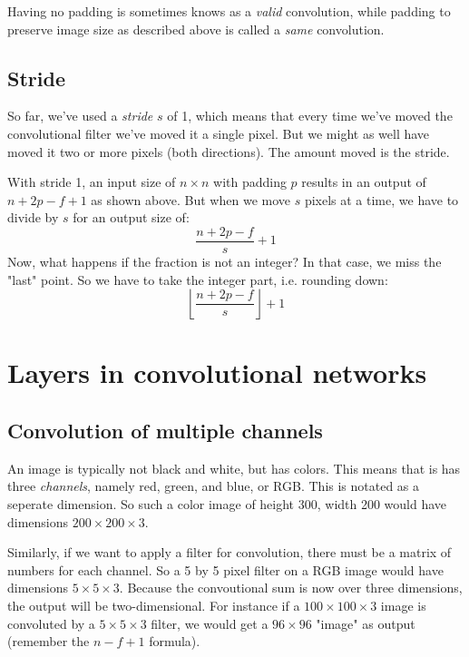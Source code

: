 \documentclass[12pt, a4paper]{article}
\numberwithin{equation}{section}
\begin{document}
Having no padding is sometimes knows as a \textit{valid} convolution, while padding to preserve image size as described above is called a \textit{same} convolution.

\subsection{Stride}
So far, we've used a \textit{stride} $s$ of 1, which means that every time we've moved the convolutional filter we've moved it a single pixel. But we might as well have moved it two or more pixels (both directions). The amount moved is the stride.

With stride 1, an input size of $n\times n$ with padding $p$ results in an output of $n+2p-f+1$ as shown above. But when we move $s$ pixels at a time, we have to divide by $s$ for an output size of:
\begin{equation}
\frac{n+2p-f}{s}+1
\end{equation}
Now, what happens if the fraction is not an integer? In that case, we miss the "last" point. So we have to take the integer part, i.e. rounding down:
\begin{equation}
\left\lfloor\frac{n+2p-f}{s}\right\rfloor+1
\end{equation}

\section{Layers in convolutional networks}

\subsection{Convolution of multiple channels}
An image is typically not black and white, but has colors. This means that is has three \textit{channels}, namely red, green, and blue, or RGB. This is notated as a seperate dimension. So such a color image of height 300, width 200 would have dimensions $200\times 200\times 3$.

Similarly, if we want to apply a filter for convolution, there must be a matrix of numbers for each channel. So a 5 by 5 pixel filter on a RGB image would have dimensions $5\times 5\times 3$. Because the convoutional sum is now over three dimensions, the output will be two-dimensional. For instance if a $100\times 100\times 3$ image is convoluted by a $5\times 5\times 3$ filter, we would get a $96\times 96$ "image" as output (remember the $n-f+1$ formula).
\end{document}
